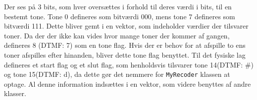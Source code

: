 Der ses på 3 bits, som hver oversættes i forhold til deres værdi i bits, til en bestemt tone.
\newline
Tone 0 defineres som bitværdi 000, mens tone 7 defineres som bitværdi 111. Dette bliver gemt i en vektor, som indeholder værdier der tilsvarer toner.
\newline
Da der der ikke kan vides hvor mange toner der kommer af gangen, defineres 8 (DTMF: 7) som en tone flag. Hvis der er behov for at afspille to ens toner afspilles efter hinanden, bliver dette tone flag benyttet.
\newline
Til det fysiske lag defineres et start flag og et slut flag, som henholdsvis tilsvarer tone 14(DTMF: \#) og tone 15(DTMF: d), da dette gør det nemmere for \texttt{MyRecoder} klassen at optage.
\newline
 Al denne information indsættes i en vektor, som videre benyttes af andre klasser.
 